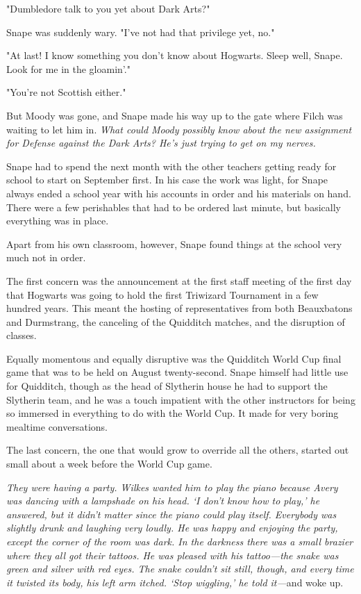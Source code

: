 "Dumbledore talk to you yet about Dark Arts?"

Snape was suddenly wary. "I've not had that privilege yet, no."

"At last! I know something you don't know about Hogwarts. Sleep well, Snape. Look for me in the gloamin'."

"You're not Scottish either."

But Moody was gone, and Snape made his way up to the gate where Filch was waiting to let him in. \emph{What could Moody possibly know about the new assignment for Defense against the Dark Arts? He's just trying to get on my nerves.}

\sbreak

Snape had to spend the next month with the other teachers getting ready for school to start on September first. In his case the work was light, for Snape always ended a school year with his accounts in order and his materials on hand. There were a few perishables that had to be ordered last minute, but basically everything was in place.

Apart from his own classroom, however, Snape found things at the school very much not in order.

The first concern was the announcement at the first staff meeting of the first day that Hogwarts was going to hold the first Triwizard Tournament in a few hundred years. This meant the hosting of representatives from both Beauxbatons and Durmstrang, the canceling of the Quidditch matches, and the disruption of classes.

Equally momentous and equally disruptive was the Quidditch World Cup final game that was to be held on August twenty-second. Snape himself had little use for Quidditch, though as the head of Slytherin house he had to support the Slytherin team, and he was a touch impatient with the other instructors for being so immersed in everything to do with the World Cup. It made for very boring mealtime conversations.

The last concern, the one that would grow to override all the others, started out small about a week before the World Cup game.

\sbreak

\emph{They were having a party. Wilkes wanted him to play the piano because Avery was dancing with a lampshade on his head. `I don't know how to play,' he answered, but it didn't matter since the piano could play itself. Everybody was slightly drunk and laughing very loudly. He was happy and enjoying the party, except the corner of the room was dark. In the darkness there was a small brazier where they all got their tattoos. He was pleased with his tattoo—the snake was green and silver with red eyes. The snake couldn't sit still, though, and every time it twisted its body, his left arm itched. `Stop wiggling,' he told it—}and woke up.

